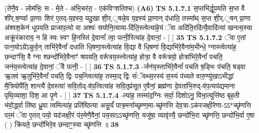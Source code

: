 \documentclass[17pt]{extarticle}
\begin{document}
                  \newline
                      (तेनै॒व - लोम॑भिः॒ स - मे॒ते - अ॑भि॒चर॑त॒ - एक॑विꣳशतिश्च)  \textbf{(A6)} \newline \newline
                                        \textbf{ TS 5.1.7.1} \newline
                  स॒प्तभि॑र्द्धूपयति स॒प्त वै शी॑र्.ष॒ण्याः᳚ प्रा॒णाः शिर॑ ए॒तद्-य॒ज्ञ्स्य॒ यदु॒खा शी॒र्.॒षन्ने॒व य॒ज्ञ्स्य॑ प्रा॒णान् द॑धाति॒ तस्मा᳚थ् स॒प्त शी॒र्.॒षन् प्रा॒णा अ॑श्वश॒केन॑ धूपयति प्राजाप॒त्यो वा अश्वः॑ सयोनि॒त्वाया-दि॑ति॒स्त्वेत्या॑हे॒यं ॅवा अदि॑ति॒रदि॑त्यै॒वादि॑त्यां खनत्य॒स्या अक्रू॑रंकाराय॒ न हि स्वः स्वꣳ हि॒नस्ति॑ दे॒वानां᳚ त्वा॒ पत्नी॒रित्या॑ह दे॒वानां॒ - [  ] \textbf{  35 } \newline
                  \newline
                                \textbf{ TS 5.1.7.2} \newline
                  ॅवा ए॒तां पत्न॒योऽग्रे॑ऽकुर्व॒न् ताभि॑रे॒वैनां᳚ दधाति धि॒षणा॒स्त्वेत्या॑ह वि॒द्या वै धि॒षणा॑ वि॒द्याभि॑रे॒वैना॑म॒भीन्धे॒ ग्नास्त्वेत्या॑ह॒ छन्दाꣳ॑सि॒ वै ग्ना श्छन्दो॑भिरे॒वैनाꣳ॑ श्रपयति॒ वरू᳚त्रय॒स्त्त्वेत्या॑ह॒ होत्रा॒ वै वरू᳚त्रयो॒ होत्रा॑भिरे॒वैनां᳚ पचति॒ जन॑य॒स्त्वेत्या॑ह दे॒वानां॒ ॅवै पत्नी॒ - [  ] \textbf{  36} \newline
                  \newline
                                \textbf{ TS 5.1.7.3} \newline
                  -र्जन॑य॒स्ताभि॑रे॒वैनां᳚ पचति ष॒ड्भिः प॑चति॒ षड्वा ऋ॒तव॑ ऋ॒तुभि॑रे॒वैनां᳚ पचति॒ द्विः पच॒न्त्वित्या॑ह॒ तस्मा॒द् द्विः सं॑ॅवथ्स॒रस्य॑ स॒स्यं प॑च्यते वारु॒ण्यु॑खाऽभीद्धा॑ मै॒त्रियोपै॑ति॒ शान्त्यै॑ दे॒वस्त्वा॑ सवि॒तोद्-व॑प॒त्वित्या॑ह सवि॒तृप्र॑सूत ए॒वैनां॒ ब्रह्म॑णा दे॒वता॑भि॒रुद्-व॑प॒त्यप॑द्यमाना पृथि॒व्याशा॒ दिश॒ आ पृ॒णे - [  ] \textbf{  37} \newline
                  \newline
                                \textbf{ TS 5.1.7.4} \newline
                  -त्या॑ह॒ तस्मा॑द॒ग्निः सर्वा॒ दिशोऽनु॒ विभा॒त्युत्ति॑ष्ठ बृह॒ती भ॑वो॒र्द्ध्वा ति॑ष्ठ ध्रु॒वा त्वमित्या॑ह॒ प्रति॑ष्ठित्या असु॒र्यं॑ पात्र॒मना᳚च्छृण्ण॒मा-च्छृ॑णत्ति देव॒त्रा-ऽक॑रजक्षी॒रेणा-ऽऽ*च्छृ॑णत्ति पर॒मं ॅवा ए॒तत् पयो॒ यद॑जक्षी॒रं प॑र॒मेणै॒वैनां॒ पय॒साऽऽच्छृ॑णत्ति॒ यजु॑षा॒ व्यावृ॑त्त्यै॒ छन्दो॑भि॒रा च्छृ॑णत्ति॒ छन्दो॑भि॒र्वा ए॒षा ( ) क्रि॑यते॒ छन्दो॑भिरे॒व छन्दाꣳ॒॒स्या च्छृ॑णत्ति ॥ \textbf{  38} \newline
                  \newline
\end{document}
